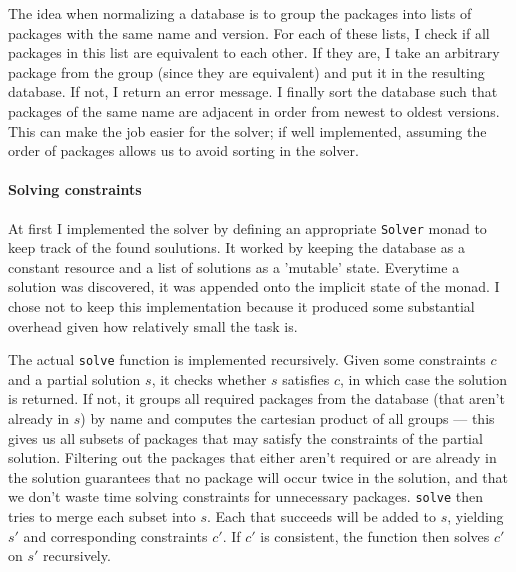The idea when normalizing a database is to group the packages into lists of packages with the same name and version. For each of these lists, I check if all packages in this list are equivalent to each other. If they are, I take an arbitrary package from the group (since they are equivalent) and put it in the resulting database. If not, I return an error message. I finally sort the database such that packages of the same name are adjacent in order from newest to oldest versions. This can make the job easier for the solver; if well implemented, assuming the order of packages allows us to avoid sorting in the solver.

\paragraph{Solving constraints}
At first I implemented the solver by defining an appropriate \texttt{Solver} monad to keep track of the found soulutions. It worked by keeping the database as a constant resource and a list of solutions as a 'mutable' state. Everytime a solution was discovered, it was appended onto the implicit state of the monad. I chose not to keep this implementation because it produced some substantial overhead given how relatively small the task is.
%
%
%
%
%

The actual \texttt{solve} function is implemented recursively. Given some constraints $c$ and a partial solution $s$, it checks whether $s$ satisfies $c$, in which case the solution is returned. If not, it groups all required packages from the database (that aren't already in $s$) by name and computes the cartesian product of all groups --- this gives us all subsets of packages that may satisfy the constraints of the partial solution. Filtering out the packages that either aren't required or are already in the solution guarantees that no package will occur twice in the solution, and that we don't waste time solving constraints for unnecessary packages. \texttt{solve} then tries to merge each subset into $s$. Each that succeeds will be added to $s$, yielding $s'$ and corresponding constraints $c'$. If $c'$ is consistent, the function then solves $c'$ on $s'$ recursively.


